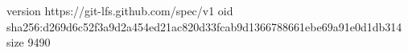 version https://git-lfs.github.com/spec/v1
oid sha256:d269d6c52f3a9d2a454ed21ac820d33fcab9d1366788661ebe69a91e0d1db314
size 9490
